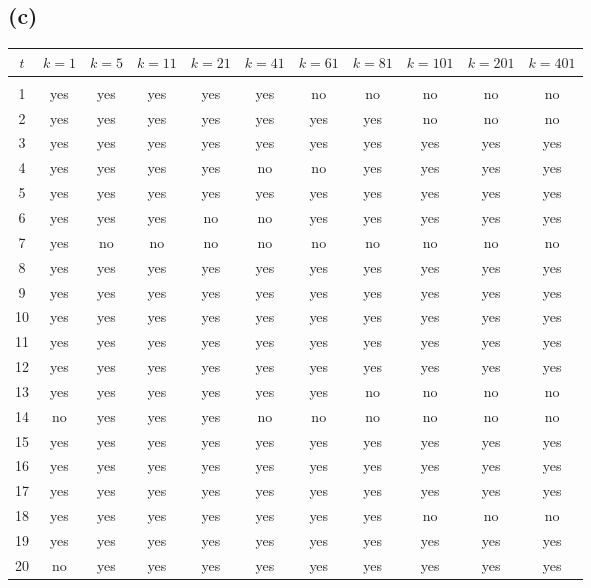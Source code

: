 \documentclass[12pt]{article}
\begin{document}
	\subsection*{(c)}
	\begin{tabular}{c | c | c | c | c | c | c | c | c | c | c}
		$t$ & $k=1$ & $k=5$ & $k=11$ & $k=21$ & $k=41$ & $k=61$ & $k=81$ & $k=101$ & $k=201$ & $k=401$ \\
		\hline & & & & & & & & & & \\
		1  & yes & yes & yes & yes & yes & no  & no  & no  & no  & no  \\
		2  & yes & yes & yes & yes & yes & yes & yes & no  & no  & no  \\
		3  & yes & yes & yes & yes & yes & yes & yes & yes & yes & yes \\
		4  & yes & yes & yes & yes & no  & no  & yes & yes & yes & yes \\
		5  & yes & yes & yes & yes & yes & yes & yes & yes & yes & yes \\
		6  & yes & yes & yes & no  & no  & yes & yes & yes & yes & yes \\
		7  & yes & no  & no  & no  & no  & no  & no  & no  & no  & no  \\	
		8  & yes & yes & yes & yes & yes & yes & yes & yes & yes & yes \\
		9  & yes & yes & yes & yes & yes & yes & yes & yes & yes & yes \\
		10 & yes & yes & yes & yes & yes & yes & yes & yes & yes & yes \\
		11 & yes & yes & yes & yes & yes & yes & yes & yes & yes & yes \\
		12 & yes & yes & yes & yes & yes & yes & yes & yes & yes & yes \\
		13 & yes & yes & yes & yes & yes & yes & no  & no  & no  & no  \\
		14 & no  & yes & yes & yes & no  & no  & no  & no  & no  & no  \\
		15 & yes & yes & yes & yes & yes & yes & yes & yes & yes & yes \\
		16 & yes & yes & yes & yes & yes & yes & yes & yes & yes & yes \\
		17 & yes & yes & yes & yes & yes & yes & yes & yes & yes & yes \\
		18 & yes & yes & yes & yes & yes & yes & yes & no  & no  & no  \\
		19 & yes & yes & yes & yes & yes & yes & yes & yes & yes & yes \\
		20 & no  & yes & yes & yes & yes & yes & yes & yes & yes & yes \\

\end{tabular}
\end{document}
